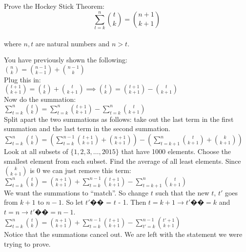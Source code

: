 \question Prove the Hockey Stick Theorem: \\
\[\sum\limits_{t = k}^n \binom{t}{k} = \binom{n + 1}{k + 1}\] \\
where $n, t$ are natural numbers and $n > t$. \\

\begin{solution}[3 cm]
You have previously shown the following: \\
$\binom{n}{k} = \binom{n - 1}{k - 1} + \binom{n - 1}{k}$ \\
Plug this in: \\
$\binom{t + 1}{k + 1} = \binom{t}{k} + \binom{t}{k + 1} \implies 
\binom{t}{k} = \binom{t + 1}{k + 1} - \binom{t}{k + 1}$ \\
Now do the summation: \\
$\sum\limits_{t = k}^n \binom{t}{k} = \sum\limits_{t = k}^n 
\binom{t + 1}{k + 1} - \sum\limits_{t = k}^n \binom{t}{k + 1}$ \\
Split apart the two summations as follows: take out the last term in the 
first summation and the last term in the second summation. \\
$\sum\limits_{t = k}^n \binom{t}{k} = \left(\sum\limits_{t = k}^{n - 1} 
\binom{t + 1}{k + 1} + \binom{n + 1}{k + 1}\right) - 
\left(\sum\limits_{t = k + 1}^n \binom{t}{k + 1} + \binom{k}{k + 1}\right)$ \\
Look at all subsets of $\{1, 2, 3, \ldots, 2015\}$ that have 1000 elements. 
Choose the smallest element from each subset. Find the average of all least 
elements. Since $\binom{k}{k + 1}$ is 0 we can just remove this term: \\
$\sum\limits_{t = k}^n \binom{t}{k} = \binom{n + 1}{k + 1} + 
\sum\limits_{t = k}^{n - 1} \binom{t + 1}{k + 1} - \sum\limits_{t = k + 1}^n 
\binom{t}{k + 1}$ \\
We want the summations to “match”. So change $t$ such that the new $t$, $t'$
goes from $k + 1$ to $n - 1$. So let $t'$�� = $t$ - 1. Then 
$t = k + 1 \rightarrow t'�� = k$ and $t = n \rightarrow t'�� = n - 1$. \\
$\sum\limits_{t = k}^n \binom{t}{k} = \binom{n + 1}{k + 1} + 
\sum\limits_{t = k}^{n - 1} \binom{t + 1}{k + 1} - \sum\limits_{t' = k}^{n - 1} 
\binom{t' + 1}{k + 1}$ \\
Notice that the summations cancel out. We are left with the statement 
we were trying to prove.
\end{solution}
    